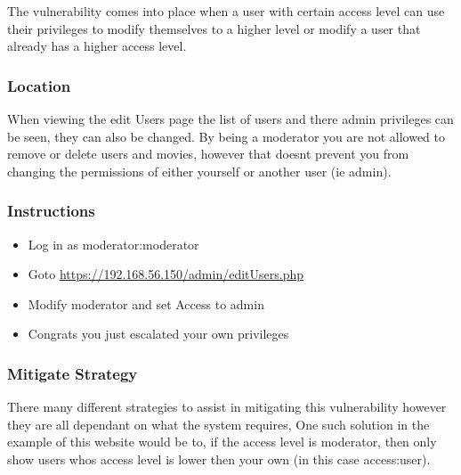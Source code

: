 \documentclass[titlepage]{article}
\begin{document}
      The vulnerability comes into place when a user with certain access level can use their privileges to modify themselves to a higher level or modify a user that already has a higher access level. 


      \subsubsection{Location} %
      \label{ssub:multiple_admin_levelsub:s_location}
      
      When viewing the edit Users page the list of users and there admin privileges can be seen, they can also be changed. By being a moderator you are not allowed to remove or delete users and movies, however that doesnt prevent you from changing the permissions of either yourself or another user (ie admin). 


      \subsubsection{Instructions} %
      \label{ssub:multiple_admin_levels_instructions}
      
      \begin{itemize}
         \item Log in as moderator:moderator
         \item Goto \url{https://192.168.56.150/admin/editUsers.php}
         \item Modify moderator and set Access to admin
         \item Congrats you just escalated your own privileges 
      \end{itemize}


      \subsubsection{Mitigate Strategy} %
      \label{ssub:multiple_admin_levels_mitigate_strategy}
      
      There many different strategies to assist in mitigating this vulnerability however they are all dependant on what the system requires, One such solution in the example of this website would be to, if the access level is moderator, then only show users whos access level is lower then your own (in this case access:user). 
\end{document}
